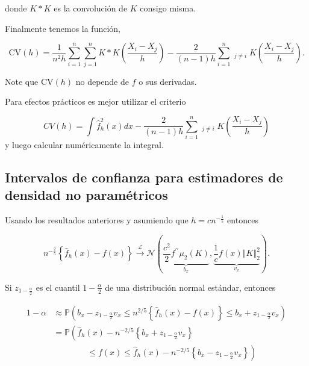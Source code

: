 \documentclass[
  12pt,
]{book}
\theoremstyle{definition}
\theoremstyle{definition}
\theoremstyle{definition}
\theoremstyle{remark}
\let\BeginKnitrBlock\begin \let\EndKnitrBlock\end
\begin{document}
donde \(K*K\) es la convolución de \(K\) consigo misma.

Finalmente tenemos la función,

\[
\mathrm{CV}(h)=\frac{1}{n^{2}h}\sum_{i=1}^{n}\sum_{j=1}^{n}K*K\left(\frac{X_{i}-X_{j}}{h}\right)-\frac{2}{(n-1)h}\sum_{i=1}^{n}\mathop{\sum_{j=1}^{n}}_{j\neq i}K\left( \frac{X_{i}-X_{j}}{h} \right).
\]

\BeginKnitrBlock{remark}
{}Note que \(\mathrm{CV}(h)\) no depende de \(f\) o sus derivadas.
\EndKnitrBlock{remark}

\BeginKnitrBlock{remark}
{}Para efectos prácticos es mejor utilizar el criterio

\[
CV(h)=\int\hat{f}_{h}^{2}(x)dx-\frac{2}{(n-1)h}\sum_{i=1}^{n}\mathop{\sum_{j=1}^{n}}_{j\neq i}K\left( \frac{X_{i}-X_{j}}{h} \right)
\]
y luego calcular numéricamente la integral.
\EndKnitrBlock{remark}

\hypertarget{intervalos-de-confianza-para-estimadores-de-densidad-no-paramuxe9tricos}{%
\subsection{Intervalos de confianza para estimadores de densidad no paramétricos}\label{intervalos-de-confianza-para-estimadores-de-densidad-no-paramuxe9tricos}}

Usando los resultados anteriores y asumiendo que \(h=cn^{-\frac{1}{5}}\) entonces

\begin{equation*}
n^{-\frac{2}{5}} \left\{ \hat{f}_{h}(x) -f(x)\right\}
\xrightarrow{\mathcal{L}} \mathcal{N}\left(\underbrace{\frac{c^{2}}{2} f^{\prime\prime}
\mu_{2}(K)}_{b_{x}}, \underbrace{\frac{1}{c}f(x) \left\Vert K \right\Vert_{2}^{2}}_{v_{x}}\right).
\end{equation*}

Si \(z_{1-\frac{\alpha}{2}}\) es el cuantil \(1-\frac{\alpha}{2}\) de una distribución normal estándar, entonces

\begin{align*}
1-\alpha
& \approx \mathbb{P}\left(b_{x}-z_{1-\frac{\alpha}{2}} v_{x} \leq n^{2 / 5}\left\{\widehat{f}_{h}(x)-f(x)\right\} \leq b_{x}+z_{1-\frac{\alpha}{2}} v_{x}\right) \\
& =\mathbb{P}\left(\widehat{f}_{h}(x)-n^{-2 / 5}\left\{b_{x}+z_{1-\frac{\alpha}{2}} v_{x}\right\}\right.                                                         \\
& \qquad\qquad \left. \leq f(x)\leq \hat{f}_{h}(x)-n^{-2 / 5}\left\{b_{x}-z_{1-\frac{\alpha}{2}} v_{x}\right\}\right)
\end{align*}
\end{document}
